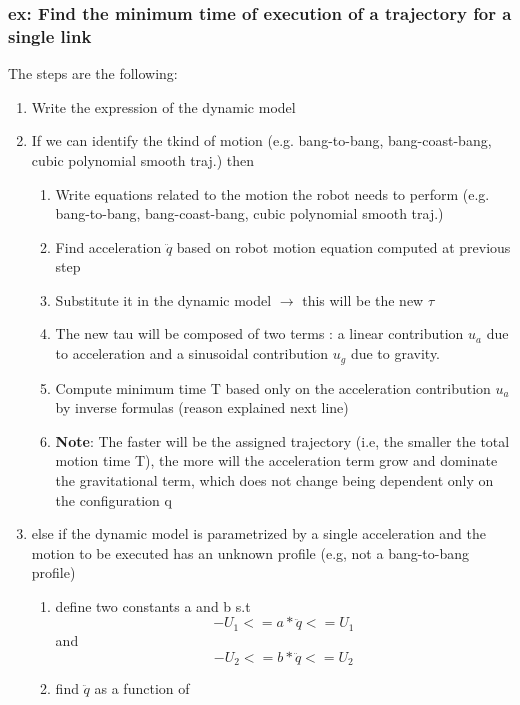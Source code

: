 \documentclass[a4paper,12pt]{article}
\begin{document}
\subsubsection{ex: Find the minimum time of execution of a trajectory for a single link}
The steps are the following:
\begin{enumerate}
<<<<<<< Updated upstream
    \item Write the expression of the dynamic model 
    \item If we can identify the tkind of motion
     (e.g. bang-to-bang, bang-coast-bang,
      cubic polynomial smooth traj.) then \begin{enumerate}
    \item Write equations related to the
     motion the robot needs to perform
      (e.g. bang-to-bang, bang-coast-bang, 
      cubic polynomial smooth traj.) 
    \item Find acceleration $\ddot{q}$ based on robot 
    motion equation computed at previous step 
    \item Substitute it in the dynamic model $\rightarrow$ this
     will be the new $\tau$
    \item The new tau will be composed of two terms : a linear contribution $u_a$ due to acceleration and a sinusoidal contribution $u_g$ due to gravity. 
    \item Compute minimum time T based only on the acceleration contribution $u_a$ by inverse formulas (reason explained next line)
    \item \textbf{Note}: The faster will be the assigned trajectory (i.e, the smaller the total motion time T),
     the more will the acceleration term grow and dominate the gravitational term, which does not change being dependent only on the configuration q 
\end{enumerate}
\item else if the dynamic model is parametrized by a single acceleration and the motion to be executed has an unknown profile (e.g, not a bang-to-bang profile) \begin{enumerate}
 \item define two constants a and b s.t 
 \begin{equation}
 -U_1 <= a*\ddot{q} <= U_1
    \end{equation}
 and 
    \begin{equation}
 -U_2 <= b*\ddot{q} <= U_2
 \end{equation}
 \item find $\ddot{q}$ as a function of 

\end{enumerate}
\end{enumerate}
\end{document}
